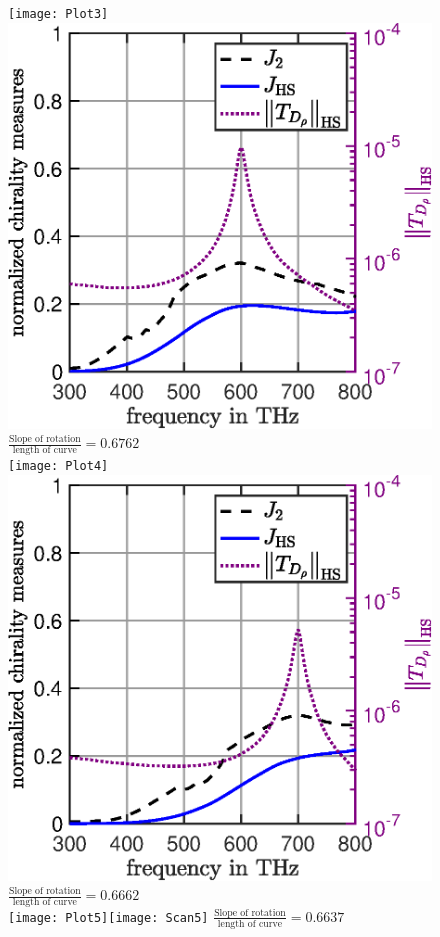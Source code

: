 \documentclass[11pt]{article}
\begin{document}
\begin{figure}
\texttt{[image: Plot3]}\hspace{-.5cm}\includegraphics[scale=.35]{Scan3}  $\frac{\text{Slope of rotation}}{\text{length of curve}}= 0.6762$\\
\texttt{[image: Plot4]}\hspace{-.5cm}\includegraphics[scale=.35]{Scan4}  $\frac{\text{Slope of rotation}}{\text{length of curve}}=0.6662$\\
\texttt{[image: Plot5]}\hspace{-.5cm}\texttt{[image: Scan5]}  $\frac{\text{Slope of rotation}}{\text{length of curve}}= 0.6637$\\
\end{figure}
\end{document}
